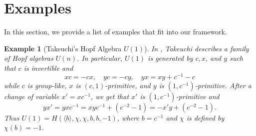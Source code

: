 \documentclass[11pt, twoside]{amsart}
\newtheorem{example}[theorem]{Example}
\theoremstyle{definition}
\begin{document}
\section{Examples}\label{section:examples}
%
In this section, we provide a list of examples that fit into our framework. 
%
\begin{example}[Takeuchi's Hopf Algebra $U(1)$]
    In \cite{Takeuchi}, Takeuchi describes a family of Hopf algebras $U(n)$. In particular, $U(1)$ is generated by $c, x$, and $y$ such that $c$ is invertible and 
    \[xc = -cx, \quad yc = -cy, \quad yx = xy + c^{-1} - c\]
    while $c$ is group-like, $x$ is $(c, 1)$-primitive, and $y$ is $(1, c^{-1})$-primitive. After a change of variable $x' = xc^{-1}$, we get that $x'$ is $(1, c^{-1})$-primitive and 
    \[yx' = yxc^{-1} = xyc^{-1} + (c^{-2} - 1) = -x'y + (c^{-2} - 1).\]
    Thus $U(1) = H(\langle b \rangle, \chi, \chi, b, b, -1)$, where $b = c^{-1}$ and $\chi$ is defined by $\chi(b) = -1$.  
\end{example}
%
\end{document}
